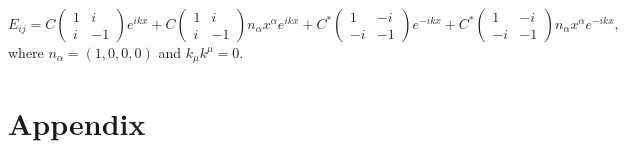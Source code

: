 \documentclass[10pt,letterpaper]{article}
\numberwithin{equation}{subsection}
\begin{document}
\begin{equation}
\boxed{
E_{ij} = C\begin{pmatrix} 1&i\\i&-1\end{pmatrix} e^{ikx} + C\begin{pmatrix} 1&i\\i&-1\end{pmatrix}  n_\alpha x^\alpha e^{ikx}
+C^*\begin{pmatrix} 1&-i\\-i&-1\end{pmatrix} e^{-ikx} + C^*\begin{pmatrix} 1&-i\\-i&-1\end{pmatrix}  n_\alpha x^\alpha e^{-ikx}},
\end{equation}
where $n_{\alpha} = (1,0,0,0)$ and $k_\mu k^\mu  =0$.
\newpage
\appendix
\section{Appendix}
\end{document}
